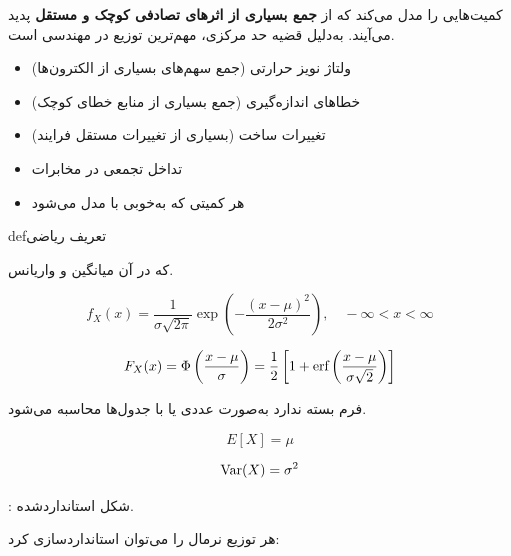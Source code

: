 

کمیت‌هایی را مدل می‌کند که از \textbf{جمع بسیاری از اثرهای تصادفی کوچک و مستقل} پدید می‌آیند. به‌دلیل قضیه حد مرکزی، مهم‌ترین توزیع در مهندسی است.


\begin{itemize}
\tightlist
\item
  ولتاژ نویز حرارتی (جمع سهم‌های بسیاری از الکترون‌ها)
\item
  خطاهای اندازه‌گیری (جمع بسیاری از منابع خطای کوچک)
\item
  تغییرات ساخت (بسیاری از تغییرات مستقل فرایند)
\item
  تداخل تجمعی در مخابرات
\item
  هر کمیتی که به‌خوبی با  مدل می‌شود
\end{itemize}

\begin{PSbox}[unbreakable]{def}{تعریف ریاضی}

 که در آن \lr{\ensuremath{\mu} =} میانگین و  واریانس.

\end{PSbox}


\[f_X(x) = \frac{1}{\sigma\sqrt{2\pi}} \exp\left(-\frac{(x-\mu)^2}{2\sigma^2}\right), \quad -\infty < x < \infty\]


\[F_X(x) = \Phi\left(\frac{x-\mu}{\sigma}\right) = \frac{1}{2}\left[1 + \text{erf}\left(\frac{x-\mu}{\sigma\sqrt{2}}\right)\right]\]

فرم بسته ندارد  به‌صورت عددی یا با جدول‌ها محاسبه می‌شود.


\[E[X] = \mu\]


\[\text{Var}(X) = \sigma^2\]


: شکل استانداردشده.

هر توزیع نرمال را می‌توان استانداردسازی کرد: 


